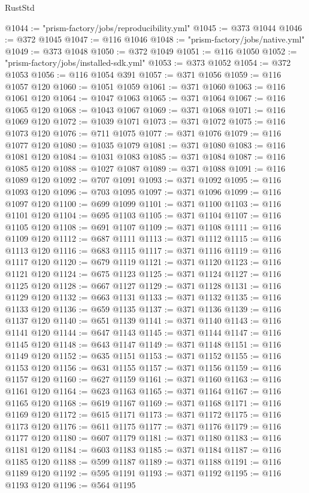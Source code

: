 \begin{lexlean}{RustStd}
\begin{coremodule}
@1044 := "prism-factory/jobs/reproducibility.yml"
@1045 := @373 @1044
@1046 := @372 @1045
@1047 := @116 @1046
@1048 := "prism-factory/jobs/native.yml"
@1049 := @373 @1048
@1050 := @372 @1049
@1051 := @116 @1050
@1052 := "prism-factory/jobs/installed-sdk.yml"
@1053 := @373 @1052
@1054 := @372 @1053
@1056 := @116 @1054 @391
@1057 := @371 @1056
@1059 := @116 @1057 @120
@1060 := @1051 @1059
@1061 := @371 @1060
@1063 := @116 @1061 @120
@1064 := @1047 @1063
@1065 := @371 @1064
@1067 := @116 @1065 @120
@1068 := @1043 @1067
@1069 := @371 @1068
@1071 := @116 @1069 @120
@1072 := @1039 @1071
@1073 := @371 @1072
@1075 := @116 @1073 @120
@1076 := @711 @1075
@1077 := @371 @1076
@1079 := @116 @1077 @120
@1080 := @1035 @1079
@1081 := @371 @1080
@1083 := @116 @1081 @120
@1084 := @1031 @1083
@1085 := @371 @1084
@1087 := @116 @1085 @120
@1088 := @1027 @1087
@1089 := @371 @1088
@1091 := @116 @1089 @120
@1092 := @707 @1091
@1093 := @371 @1092
@1095 := @116 @1093 @120
@1096 := @703 @1095
@1097 := @371 @1096
@1099 := @116 @1097 @120
@1100 := @699 @1099
@1101 := @371 @1100
@1103 := @116 @1101 @120
@1104 := @695 @1103
@1105 := @371 @1104
@1107 := @116 @1105 @120
@1108 := @691 @1107
@1109 := @371 @1108
@1111 := @116 @1109 @120
@1112 := @687 @1111
@1113 := @371 @1112
@1115 := @116 @1113 @120
@1116 := @683 @1115
@1117 := @371 @1116
@1119 := @116 @1117 @120
@1120 := @679 @1119
@1121 := @371 @1120
@1123 := @116 @1121 @120
@1124 := @675 @1123
@1125 := @371 @1124
@1127 := @116 @1125 @120
@1128 := @667 @1127
@1129 := @371 @1128
@1131 := @116 @1129 @120
@1132 := @663 @1131
@1133 := @371 @1132
@1135 := @116 @1133 @120
@1136 := @659 @1135
@1137 := @371 @1136
@1139 := @116 @1137 @120
@1140 := @651 @1139
@1141 := @371 @1140
@1143 := @116 @1141 @120
@1144 := @647 @1143
@1145 := @371 @1144
@1147 := @116 @1145 @120
@1148 := @643 @1147
@1149 := @371 @1148
@1151 := @116 @1149 @120
@1152 := @635 @1151
@1153 := @371 @1152
@1155 := @116 @1153 @120
@1156 := @631 @1155
@1157 := @371 @1156
@1159 := @116 @1157 @120
@1160 := @627 @1159
@1161 := @371 @1160
@1163 := @116 @1161 @120
@1164 := @623 @1163
@1165 := @371 @1164
@1167 := @116 @1165 @120
@1168 := @619 @1167
@1169 := @371 @1168
@1171 := @116 @1169 @120
@1172 := @615 @1171
@1173 := @371 @1172
@1175 := @116 @1173 @120
@1176 := @611 @1175
@1177 := @371 @1176
@1179 := @116 @1177 @120
@1180 := @607 @1179
@1181 := @371 @1180
@1183 := @116 @1181 @120
@1184 := @603 @1183
@1185 := @371 @1184
@1187 := @116 @1185 @120
@1188 := @599 @1187
@1189 := @371 @1188
@1191 := @116 @1189 @120
@1192 := @595 @1191
@1193 := @371 @1192
@1195 := @116 @1193 @120
@1196 := @564 @1195

\end{coremodule}
\end{lexlean}
